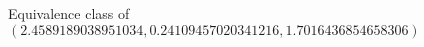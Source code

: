 \documentclass[preview]{standalone}
\begin{document}
\begin{center}
Equivalence class of $(2.4589189038951034, 0.24109457020341216, 1.7016436854658306)$
\end{center}
\end{document}
